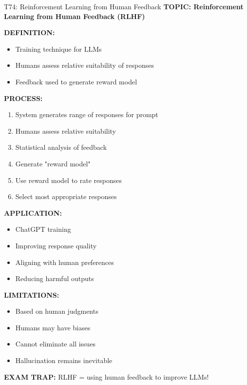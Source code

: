 \documentclass[8pt]{beamer}
\begin{document}
	\begin{frame}{T74: Reinforcement Learning from Human Feedback}
		\fontsize{6.5}{7.5}\selectfont
		\textbf{TOPIC: Reinforcement Learning from Human Feedback (RLHF)}
		
		\vspace{0.1cm}
		\textbf{DEFINITION:}
		\begin{itemize}
			\item Training technique for LLMs
			\item Humans assess relative suitability of responses
			\item Feedback used to generate reward model
		\end{itemize}
		
		\vspace{0.1cm}
		\textbf{PROCESS:}
		\begin{enumerate}
			\item System generates range of responses for prompt
			\item Humans assess relative suitability
			\item Statistical analysis of feedback
			\item Generate "reward model"
			\item Use reward model to rate responses
			\item Select most appropriate responses
		\end{enumerate}
		
		\vspace{0.1cm}
		\textbf{APPLICATION:}
		\begin{itemize}
			\item ChatGPT training
			\item Improving response quality
			\item Aligning with human preferences
			\item Reducing harmful outputs
		\end{itemize}
		
		\vspace{0.1cm}
		\textbf{LIMITATIONS:}
		\begin{itemize}
			\item Based on human judgments
			\item Humans may have biases
			\item Cannot eliminate all issues
			\item Hallucination remains inevitable
		\end{itemize}
		
		\textcolor{myred}{\textbf{EXAM TRAP:}} RLHF = \textcolor{myblue}{using human feedback to improve LLMs}!
	\end{frame}
	
\end{document}

